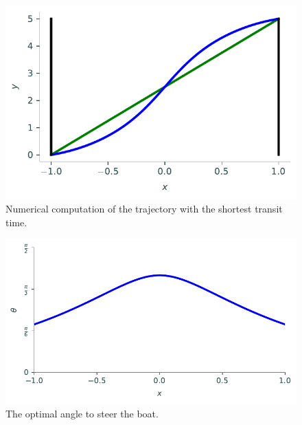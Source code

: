 \begin{figure}[H]
\centering
\includegraphics[width=\textwidth]{figures/minimum_time_rivercrossing.pdf}
\caption{Numerical computation of the trajectory with the shortest transit time.}
\label{fig:rivercrossing_trajectory}
\end{figure}



\begin{figure}[H]
\centering
\includegraphics[width=\textwidth]{figures/trajectory_angle.pdf}
\caption{The optimal angle to steer the boat.}
\label{fig:rivercrossing_angle}
\end{figure}






